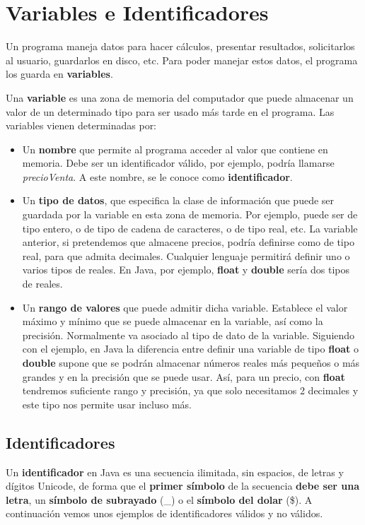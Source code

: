 \section{Variables e Identificadores}
Un programa maneja datos para hacer cálculos, presentar resultados, solicitarlos al usuario, guardarlos en disco, etc. Para poder manejar estos datos, el programa los guarda en \textbf{variables}.

Una \textbf{variable} es una zona de memoria del computador que puede almacenar un valor de un determinado tipo para ser usado más tarde en el programa. Las variables vienen determinadas por:

\begin{itemize}
    \item Un \textbf{nombre} que permite al programa acceder al valor que contiene en memoria. Debe ser un identificador válido, por ejemplo, podría llamarse \textit{precioVenta}. A este nombre, se le conoce como \textbf{identificador}.

    \item Un \textbf{tipo de datos}, que especifica la clase de información que puede ser guardada por la variable en esta zona de memoria. Por ejemplo, puede ser de tipo entero, o de tipo de cadena de caracteres, o de tipo real, etc. La variable anterior, si pretendemos que almacene precios, podría definirse como de tipo real, para que admita decimales. Cualquier lenguaje permitirá definir uno o varios tipos de reales. En Java, por ejemplo, \textbf{float} y \textbf{double} sería dos tipos de reales.

    \item Un \textbf{rango de valores} que puede admitir dicha variable. Establece el valor máximo y mínimo que se puede almacenar en la variable, así como la precisión. Normalmente va asociado al tipo de dato de la variable. Siguiendo con el ejemplo, en Java la diferencia entre definir una variable de tipo \textbf{float} o \textbf{double} supone que se podrán almacenar números reales más pequeños o más grandes y en la precisión que se puede usar. Así, para un precio, con \textbf{float} tendremos suficiente rango y precisión, ya que solo necesitamos 2 decimales y este tipo nos permite usar incluso más.
\end{itemize}

\subsection{Identificadores}
Un \textbf{identificador} en Java es una secuencia ilimitada, sin espacios, de letras y dígitos Unicode, de forma que el \textbf{primer símbolo} de la secuencia \textbf{debe ser una letra}, un \textbf{símbolo de subrayado} (\_) o el \textbf{símbolo del dolar} (\$). A continuación vemos unos ejemplos de identificadores válidos y no válidos.


